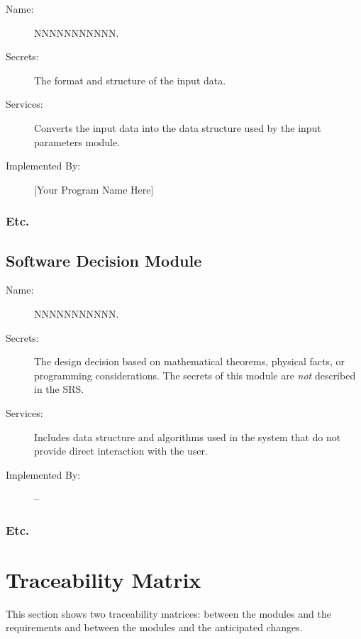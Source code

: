 \documentclass[12pt, titlepage]{article}
\newcommand{\newSection}[1]{
  \newpage
  \section{#1}
}
\begin{document}
		\bigskip\begin{description}
			\item[Name:]NNNNNNNNNNN.
			\item[Secrets:]The format and structure of the input data.
			\item[Services:]Converts the input data into the data structure used by the input parameters module.
			\item[Implemented By:] [Your Program Name Here]
		\end{description}

	  \subsubsection{Etc.}

	\subsection{Software Decision Module}

		\bigskip\begin{description}
			\item[Name:]NNNNNNNNNNN.
			\item[Secrets:] The design decision based on mathematical theorems, physical facts, or programming considerations. The secrets of this module are \emph{not} described in the SRS.
			\item[Services:] Includes data structure and algorithms used in the system that do not provide direct interaction with the user. 
			\item[Implemented By:] --
		\end{description}

	  \subsubsection{Etc.}

\newSection{Traceability Matrix} \label{SecTM}

	This section shows two traceability matrices: between the modules and the
	requirements and between the modules and the anticipated changes.
\end{document}
